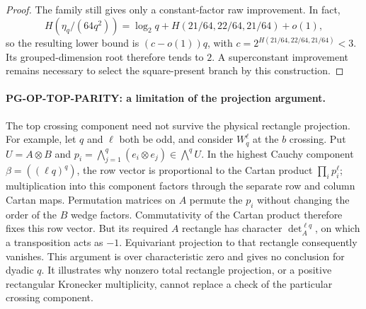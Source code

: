 \begin{proof}
The family still gives only a constant-factor raw improvement. In fact,
\[
 H(\eta_q/(64q^2))
   =\log_2q+H(21/64,22/64,21/64)+o(1),
\]
so the resulting lower bound is $(c-o(1))q$, with
$c=2^{H(21/64,22/64,21/64)}<3$. Its grouped-dimension root therefore
tends to $2$. A superconstant improvement remains necessary to select
the square-present branch by this construction.
\end{proof}

\paragraph{PG-OP-TOP-PARITY: a limitation of the projection argument.}
The top crossing component need not survive the physical rectangle
projection. For example, let $q$ and $\ell$ both be odd, and consider
$W_q^\ell$ at the $b$ crossing. Put $U=A\otimes B$ and
$p_i=\bigwedge_{j=1}^q(e_i\otimes e_j)\in\bigwedge^q U$.
In the highest Cauchy component
$\beta=((\ell q)^q)$, the row vector is proportional to the Cartan
product $\prod_i p_i^\ell$; multiplication into this component factors
through the separate row and column Cartan maps. Permutation matrices
on $A$ permute the $p_i$ without changing the order of the $B$ wedge
factors. Commutativity of the Cartan product therefore fixes this row
vector. But its required $A$ rectangle has character
$\det_A^{\ell q}$, on which a transposition acts as $-1$.
Equivariant projection to that rectangle consequently vanishes.
This argument is over characteristic zero and gives no conclusion
for dyadic $q$. It illustrates why nonzero total rectangle projection,
or a positive rectangular Kronecker multiplicity, cannot replace a
check of the particular crossing component.

